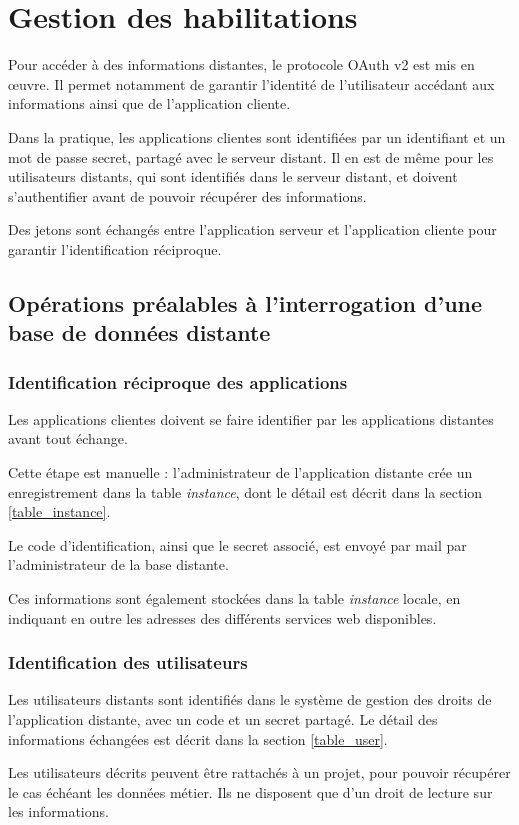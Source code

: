 \chapter{Gestion des habilitations}
\label{habilitation}
Pour accéder à des informations distantes, le protocole OAuth v2 est mis en œuvre. Il permet notamment de garantir l'identité de l'utilisateur accédant aux informations ainsi que de l'application cliente.

Dans la pratique, les applications clientes sont identifiées par un identifiant et un mot de passe secret, partagé avec le serveur distant.
Il en est de même pour les utilisateurs distants, qui sont identifiés dans le serveur distant, et doivent s'authentifier avant de pouvoir récupérer des informations.

Des jetons sont échangés entre l'application serveur et l'application cliente pour garantir l'identification réciproque. 

\section{Opérations préalables à l'interrogation d'une base de données distante}
\subsection{Identification réciproque des applications}

Les applications clientes doivent se faire identifier par les applications distantes avant tout échange.

Cette étape est manuelle : l'administrateur de l'application distante crée un enregistrement dans la table \textit{instance}, dont le détail est décrit dans la section \ref{table_instance}.

Le code d'identification, ainsi que le secret associé, est envoyé par mail par l'administrateur de la base distante.

Ces informations sont également stockées dans la table \textit{instance} locale, en indiquant en outre les adresses des différents services web disponibles.

\subsection{Identification des utilisateurs}
Les utilisateurs distants sont identifiés dans le système de gestion des droits de l'application distante, avec un code et un secret partagé. Le détail des informations échangées est décrit dans la section \ref{table_user}.

Les utilisateurs décrits peuvent être rattachés à un projet, pour pouvoir récupérer le cas échéant les données \og métier\fg{}. Ils ne disposent que d'un droit de lecture sur les informations.
